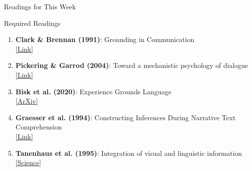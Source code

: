 \documentclass[aspectratio=169]{beamer}
\begin{document}
\begin{frame}{Readings for This Week 📖}
\small
    \begin{block}{Required Readings}
        \begin{enumerate}\setlength{\itemsep}{0pt}
            \item \textbf{Clark \& Brennan (1991)}: Grounding in Communication \\
            \href{https://www.sciencedirect.com/science/article/pii/B9780080507378500167}{[Link]}

            \item \textbf{Pickering \& Garrod (2004)}: Toward a mechanistic psychology of dialogue \\
            \href{https://www.cambridge.org/core/journals/behavioral-and-brain-sciences/article/toward-a-mechanistic-psychology-of-dialogue/D9C9E72F9DDCB6494A0F156A97DCC6C7}{[Link]}

            \item \textbf{Bisk et al. (2020)}: Experience Grounds Language \\
            \href{https://arxiv.org/abs/2004.10151}{[ArXiv]}

            \item \textbf{Graesser et al. (1994)}: Constructing Inferences During Narrative Text Comprehension \\
            \href{https://psycnet.apa.org/record/1994-97967-001}{[Link]}

            \item \textbf{Tanenhaus et al. (1995)}: Integration of visual and linguistic information \\
            \href{https://www.science.org/doi/10.1126/science.7777863}{[Science]}
        \end{enumerate}
    \end{block}
\end{frame}
\end{document}

